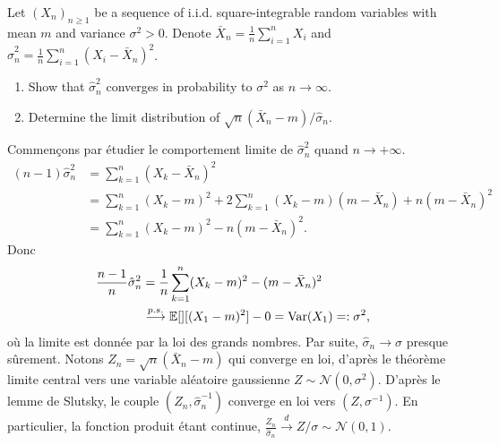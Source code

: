\begin{Exercise}
  Let $\left(X_{n}\right)_{n \geq 1}$ be a sequence of i.i.d. square-integrable random variables with mean $m$ and variance $\sigma^{2}>0$. Denote $\bar{X}_{n}=\frac{1}{n} \sum_{i=1}^{n} X_{i}$ and $\hat{\sigma}_{n}^{2}=\frac{1}{n} \sum_{i=1}^{n}\left(X_{i}-\bar{X}_{n}\right)^{2}$.

  \begin{enumerate}
    \item Show that $\hat{\sigma}_{n}^{2}$ converges in probability to $\sigma^{2}$ as $n
            \rightarrow \infty$.

    \item Determine the limit distribution of $\sqrt{n}\left(\bar{X}_{n}-m\right) /
            \hat{\sigma}_{n}$.

  \end{enumerate}
\end{Exercise}

\begin{solution}
  Commen\c cons par \'etudier le comportement limite de $\hat{\sigma}_n^2$ quand $n\to +\infty$.
  \begin{align*}
    (n-1)\hat{\sigma}_n^2
     & =\sum_{k=1}^n(X_k-\bar X_n)^2                                                 \\
     & =  \sum_{k=1}^n(X_k-m)^2 + 2\sum_{k=1}^n(X_k-m)(m-\bar X_n) + n(m-\bar X_n)^2 \\
     & = \sum_{k=1}^n(X_k-m)^2 - n(m-\bar X_n)^2.
  \end{align*}
  Donc
  \begin{align*}
    \frac{n-1}{n}\hat{\sigma}_n^2 & = \frac{1}{n}\sum_{k=1}^n(X_k-m)^2 - (m-\bar X_n)^2                           \\
                                  & \overset{p.s.}{\longrightarrow}\mathbb{E}[][(X_1-m)^2]-0= \mathrm{Var}(X_1)=:
    \sigma^2,
  \end{align*}
  o\`u la limite est donn\'ee par la loi des grands nombres. Par suite, $\hat{\sigma}_n \to \sigma$ presque s\^urement. Notons $Z_n = \sqrt{n}(\bar X_n-m)$ qui converge en loi, d'apr\`es le th\'eor\`eme limite central vers une variable al\'eatoire gaussienne $Z\sim \mathcal{N}(0,\sigma^2)$. D'apr\`es le lemme de Slutsky, le couple $(Z_n,\hat{\sigma}_n^{-1})$ converge en loi vers $(Z,\sigma^{-1})$. En particulier, la fonction produit \'etant continue, $\frac{Z_n}{\hat{\sigma}_n} \overset{d}{\rightarrow} Z/\sigma \sim \mathcal{N}(0,1).$
\end{solution}

